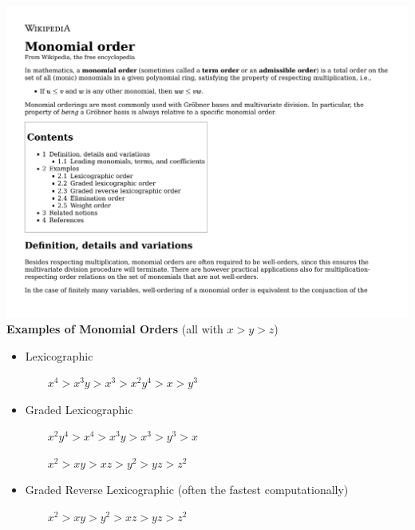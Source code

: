\documentclass{beamer}
\begin{document}
\begin{frame}
\includegraphics[page=1, clip, trim=0in 5.5in 0in 0in, width=\textwidth]{Monomial order - Wikipedia.pdf}
\vskip 20pt
{\bf Examples of Monomial Orders} (all with $x>y>z$)
\begin{itemize}
\item Lexicographic

$\qquad x^4 > x^3y > x^3 > x^2y^4 > x > y^3$
\item Graded Lexicographic

$\qquad x^2y^4 > x^4 > x^3y > x^3 > y^3 > x$

$\qquad x^2 > xy > xz > y^2 > yz > z^2$
\item Graded Reverse Lexicographic (often the fastest computationally)

$\qquad x^2 > xy > y^2 > xz > yz > z^2$
\end{itemize}
\end{frame}


\end{document}
